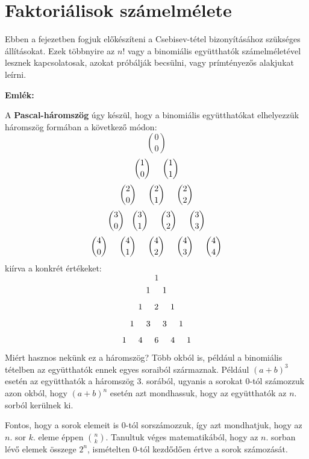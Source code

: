\documentclass[12pt]{book}
\theoremstyle{plain} %
\theoremstyle{definition} %
\theoremstyle{remark}
\numberwithin{equation}{section}  %
\begin{document}
	
	\section{Faktoriálisok számelmélete}
	
	Ebben a fejezetben fogjuk előkészíteni a Csebisev-tétel bizonyításához szükséges állításokat. Ezek többnyire az $n!$ vagy a binomiális együtthatók számelméletével lesznek kapcsolatosak, azokat próbálják becsülni, vagy prímtényezős alakjukat leírni.
	
	\textbf{Emlék: }
	
	A \textbf{Pascal-háromszög} úgy készül, hogy a binomiális együtthatókat elhelyezzük háromszög formában a következő módon:
	\[ {0\choose0} \]
	\[ {1\choose0} \hspace{5mm} {1\choose1}  \]
	\[ {2\choose0} \hspace{5mm} {2\choose1} \hspace{5mm} {2\choose2} \]
	\[ {3\choose0} \hspace{3mm} {3\choose1} \hspace{5mm} {3\choose2} \hspace{5mm} {3\choose3}\]
	\[ {4\choose0} \hspace{5mm} {4\choose1} \hspace{5mm} {4\choose2} \hspace{5mm} {4\choose3} \hspace{5mm} {4\choose4}\]
	kiírva a konkrét értékeket:
	\[ 1 \]
	\[ 1 \hspace{5mm} 1  \]
	\[ 1 \hspace{5mm} 2 \hspace{5mm} 1 \]
	\[ 1 \hspace{5mm} 3 \hspace{5mm} 3 \hspace{5mm} 1\]
	\[ 1 \hspace{5mm} 4 \hspace{5mm} 6 \hspace{5mm} 4 \hspace{5mm} 1\]
	Miért hasznos nekünk ez a háromszög? Több okból is, például a binomiális tételben az együtthatók ennek egyes soraiból származnak. Például $(a+b)^3$ esetén az együtthatók a háromszög $3$. sorából, ugyanis a sorokat $0$-tól számozzuk azon okból, hogy $(a+b)^n$ esetén azt mondhassuk, hogy az együtthatók az $n$. sorból kerülnek ki.
	
	Fontos, hogy a sorok elemeit is $0$-tól sorszámozzuk, így azt mondhatjuk, hogy az $n$. sor $k$. eleme éppen ${n\choose k}$. Tanultuk véges matematikából, hogy az $n$. sorban lévő elemek összege $2^n$, ismételten $0$-tól kezdődően értve a sorok számozását.
	
\end{document}
